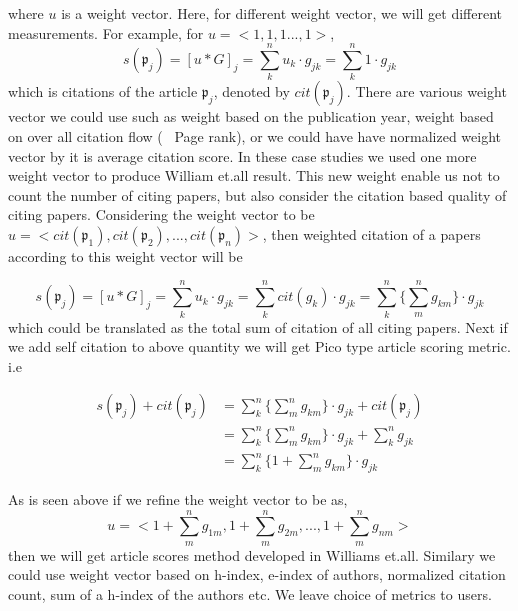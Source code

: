 \documentclass[review]{elsarticle}
\begin{document}
where $u$ is a weight vector. Here, for different weight vector, we will get different measurements.
For example, for  $u=<1,1,1...,1>$,
\begin{equation*}
s(\mathfrak{p}_j) = [u*G]_{j} = \sum_k^n  u_k \cdot g_{jk}=\sum_k^n  1\cdot g_{jk}
\end{equation*}
which is citations of the article $\mathfrak{p}_j$, denoted by $cit(\mathfrak{p}_j)$. There are various weight vector we could use such as weight based on the publication year, weight based on over all citation flow (~ Page rank), or we could have have normalized weight vector by it is average citation score. In these case studies we used one more weight vector to produce William et.all result. This new weight enable us not to count the number of citing papers, but also consider the citation based quality of citing papers. Considering the weight vector to be $u=<cit(\mathfrak{p}_1),cit(\mathfrak{p}_2),...,cit(\mathfrak{p}_n)>$, then weighted citation of a papers according to this weight vector will be

\begin{equation*}
s(\mathfrak{p}_j) = [u*G]_{j} = \sum_k^n  u_k \cdot g_{jk}=\sum_k^n  cit(g_k)\cdot g_{jk} =\sum_k^n  \{\sum_m^n  g_{km}\} \cdot g_{jk}
\end{equation*}
which could be translated as the total sum of citation of all citing papers. Next if we add self citation to above quantity we will get Pico type article scoring metric. i.e

 
 \begin{equation}
 \begin{split}
s(\mathfrak{p}_j)+cit(\mathfrak{p}_j) & = \sum_k^n   \{\sum_m^n  g_{km}\} \cdot g_{jk} +cit(\mathfrak{p}_j)  \\
						       & =\sum_k^n   \{\sum_m^n  g_{km}\} \cdot g_{jk}+ \sum_k^n  g_{jk} \\
                                                          & =\sum_k^n   \{ 1+ \sum_m^n  g_{km} \} \cdot g_{jk}
\end{split}                                                          
\end{equation}

As is seen above if we refine the weight vector to be as, 
\begin{equation}\label{wu}
u = < 1+ \sum_m^n  g_{1m}  ,  1+  \sum_m^n  g_{2m} , ...,  1 +  \sum_m^n  g_{nm} >
\end{equation}
then  we will get article scores method developed in Williams et.all. Similary we could use weight vector based on h-index, e-index of authors, normalized citation count, sum of a h-index of the authors etc. We leave choice of metrics to users.
\end{document}
